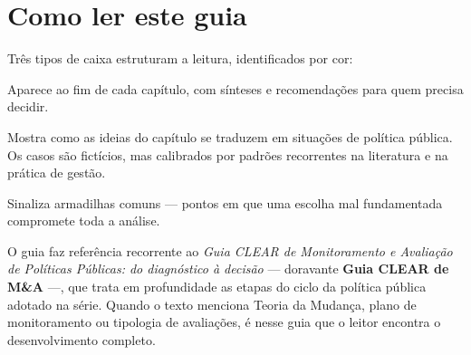 \documentclass[12pt, a4paper, openany]{book}
\numberwithin{equation}{chapter}
\numberwithin{table}{chapter}
\numberwithin{figure}{chapter}
\begin{document}
\section*{Como ler este guia}
Três tipos de caixa estruturam a leitura, identificados por cor:
\vspace{0.3cm}
\begin{notabox}
Aparece ao fim de cada capítulo, com sínteses e recomendações para quem
precisa decidir.
\end{notabox}
\begin{exemplobox}
Mostra como as ideias do capítulo se traduzem em situações de política
pública. Os casos são fictícios, mas calibrados por padrões recorrentes
na literatura e na prática de gestão.
\end{exemplobox}
\begin{atencaobox}
Sinaliza armadilhas comuns --- pontos em que uma escolha mal fundamentada
compromete toda a análise.
\end{atencaobox}
\vspace{0.5cm}
\noindent O guia faz referência recorrente ao \textit{Guia CLEAR de
Monitoramento e Avaliação de Políticas Públicas: do diagnóstico à decisão}
\citep{Lima2025} --- doravante \textbf{Guia CLEAR de M\&A} ---, que trata
em profundidade as etapas do ciclo da política pública adotado na série.
Quando o texto menciona Teoria da Mudança, plano de monitoramento ou
tipologia de avaliações, é nesse guia que o leitor encontra o
desenvolvimento completo.
\newpage

\tableofcontents
\newpage


\mainmatter








\backmatter

\end{document}
